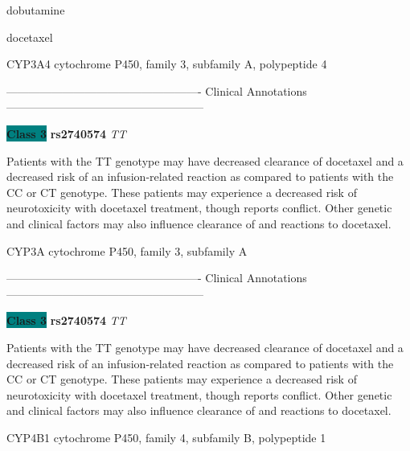 \documentclass{resume} %
\begin{document}
\begin{rSection}{ dobutamine }
\end{rSection}\begin{rSection}{ docetaxel }
\item[]

\begin{rSubsection}{ CYP3A4 }{ cytochrome P450, family 3, subfamily A, polypeptide 4 }{}{}
\item[]

\item[] ---------------------------------------------------- Clinical Annotations -----------------------------------------------------\newline
\item \textbf{\colorbox{teal} {Class 3}} \textbf{ rs2740574 } \textit{ TT }
\item[] Patients with the TT genotype may have decreased clearance of docetaxel and a decreased risk of an infusion-related reaction as compared to patients with the CC or CT genotype. These patients may experience a decreased risk of neurotoxicity with docetaxel treatment, though reports conflict. Other genetic and clinical factors may also influence clearance of and reactions to docetaxel.
\end{rSubsection}\begin{rSubsection}{ CYP3A }{ cytochrome P450, family 3, subfamily A }{}{}
\item[]

\item[] ---------------------------------------------------- Clinical Annotations -----------------------------------------------------\newline
\item \textbf{\colorbox{teal} {Class 3}} \textbf{ rs2740574 } \textit{ TT }
\item[] Patients with the TT genotype may have decreased clearance of docetaxel and a decreased risk of an infusion-related reaction as compared to patients with the CC or CT genotype. These patients may experience a decreased risk of neurotoxicity with docetaxel treatment, though reports conflict. Other genetic and clinical factors may also influence clearance of and reactions to docetaxel.
\end{rSubsection}\begin{rSubsection}{ CYP4B1 }{ cytochrome P450, family 4, subfamily B, polypeptide 1 }{}{}
\item[]


\end{rSubsection}
\end{rSection}
\end{document}
